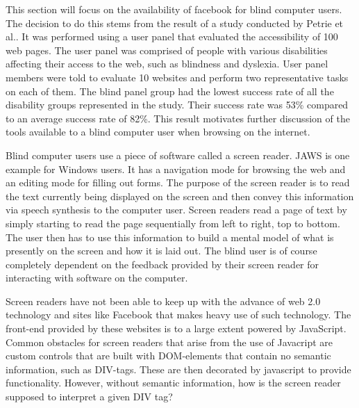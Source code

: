 \documentclass[conference]{IEEEtran}
\begin{document}

This section will focus on the availability of facebook for blind computer
users. The decision to do this stems from the result of a study conducted by
Petrie et al.\cite{petrie2004}. It was performed using a user panel that
evaluated the accessibility of 100 web pages.  The user panel was comprised of
people with various disabilities affecting their access to the web, such as
blindness and dyslexia. User panel members were told to evaluate 10 websites
and perform two representative tasks on each of them. The blind panel group had
the lowest success rate of all the disability groups represented in the study.
Their success rate was 53\% compared to an average success rate of 82\%.  This
result motivates further discussion of the tools available to a blind computer
user when browsing on the internet.

Blind computer users use a piece of software called a screen reader.
JAWS\cite{jaws} is one example for Windows users. It has a navigation mode for
browsing the web and an editing mode for filling out forms. The purpose of the
screen reader is to read the text currently being displayed on the screen and
then convey this information via speech synthesis to the computer user. Screen
readers read a page of text by simply starting to read the page sequentially
from left to right, top to bottom. The user then has to use this information to
build a mental model of what is presently on the screen and how it is laid out.
The blind user is of course completely dependent on the feedback provided by
their screen reader for interacting with software on the computer. 

Screen readers have not been able to keep up with the advance of web 2.0
technology and sites like Facebook that makes heavy use of such technology. The
front-end provided by these websites is to a large extent powered by
JavaScript.  Common obstacles for screen readers that arise from the use of
Javacript are custom controls\cite{ariaprimer} that are built with DOM-elements
that contain no semantic information, such as DIV-tags. These are then
decorated by javascript to provide functionality.  However, without semantic
information, how is the screen reader supposed to interpret a given DIV tag?  
\end{document}
